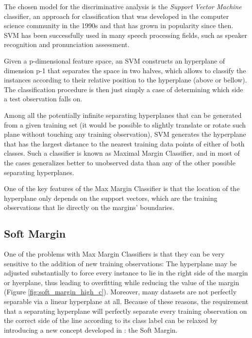 
The chosen model for the discriminative analysis is the \textit{Support Vector Machine} classifier,
an approach for classification that was developed in the computer science community in the 1990s
and that has grown in popularity since then. SVM has been successfully used in many
speech processing fields, such as speaker recognition and pronunciation assessment.

Given a p-dimensional feature space, an SVM constructs an hyperplane of dimension p-1
that separates the space in two halves, which allows to classify the instances according
to their relative position to the hyperplane (above or bellow). The classification
procedure is then just simply a case of determining which side a test observation falls on.

Among all the potentially infinite separating hyperplanes that can be generated from a
given training set (it would be possible to slightly translate or rotate such plane without
touching any training observation), SVM generates the hyperplane that has the largest
distance to the nearest training data points of either of both classes. Such a classifier
is known as Maximal Margin Classifier, and in most of the cases generalizes better to
unobserved data than any of the other possible separating hyperplanes.

One of the key features of the Max Margin Classifier is that the location of the hyperplane
only depends on the support vectors, which are the training observations that lie directly
on the margins' boundaries.

\subsection{Soft Margin}

One of the problems with Max Margin Classifiers is that they can be very sensitive to the
addition of new training observations: The hyperplane may be adjusted substantially
to force every instance to lie in the right side of the margin or hyerplane, thus leading
to overfitting while reducing the value of the margin (Figure \ref{fig:soft_margin_high_c}).
Moreover, many datasets are not perfectly separable via a linear hyperplane at all.
Because of these reasons, the requirement that a separating hyperplane will perfectly separate
every training observation on the correct side of the line according to its class label can
be relaxed by introducing a new concept developed in \cite{svm_soft_margin}: the Soft Margin.

